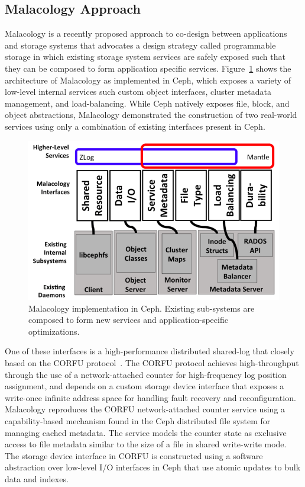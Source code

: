 \subsection{Malacology Approach}

Malacology is a recently proposed approach to co-design between applications
and storage systems that advocates a design strategy called programmable
storage in which existing storage system services are safely exposed such that
they can be composed to form application specific services.
Figure~\ref{fig:malacology} shows the architecture of Malacology as
implemented in Ceph, which exposes a variety of low-level internal services
such custom object interfaces, cluster metadata management, and
load-balancing. While Ceph natively exposes file, block, and object
abstractions, Malacology demonstrated the construction of two real-world
services using only a combination of existing interfaces present in Ceph.

\begin{figure}[t]
\centering
\includegraphics[width=1.0\linewidth]{implementation-overview.png}
\caption{Malacology implementation in Ceph. Existing sub-systems are composed
    to form new services and application-specific optimizations.}
\label{fig:malacology}
\end{figure}

One of these interfaces is a high-performance distributed shared-log that
closely based on the CORFU protocol~\cite{balakrishnan:nsdi12}. The CORFU
protocol achieves high-throughput through the use of a network-attached
counter for high-frequency log position assignment, and depends on a custom
storage device interface that exposes a write-once infinite address space for
handling fault recovery and reconfiguration. Malacology reproduces the CORFU
network-attached counter service using a capability-based mechanism found in
the Ceph distributed file system for managing cached metadata. The service
models the counter state as exclusive access to file metadata similar to the
size of a file in shared write-write mode. The storage device interface in
CORFU is constructed using a software abstraction over low-level I/O
interfaces in Ceph that use atomic updates to bulk data and indexes.

